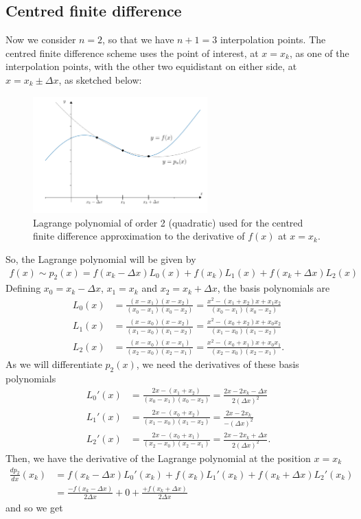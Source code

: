 \subsection{Centred finite difference}
Now we consider $n=2$, so that we have $n+1=3$ interpolation points. The centred finite difference scheme uses the point of interest, at $x=x_k$, as one of the interpolation points, with the other two equidistant on either side, at $x=x_k \pm \Delta x$, as sketched below:
\begin{figure}[H]
	\begin{center}
	\includegraphics[width=0.6\textwidth]{figures/ch5_centred_finite_difference.pdf} 
	  \caption{Lagrange polynomial of order 2 (quadratic) used for the centred finite difference approximation to the derivative of $f(x)$ at $x=x_k$.} \label{fig:ch5_centred_finite_difference}
	\end{center}
\end{figure}
So, the Lagrange polynomial will be given by
\begin{align*}
f(x) \sim p_2(x) = f(x_k - \Delta x)L_0(x) + f(x_k)L_1(x) + f(x_k + \Delta x)L_2(x)
\end{align*}
Defining $x_0=x_k - \Delta x$, $x_1=x_k$ and  $x_2=x_k + \Delta x$, the basis polynomials are
\begin{align*}
L_0(x) &= \frac{(x-x_1)(x-x_2)}{(x_0-x_1)(x_0-x_2)} = \frac{x^2 - (x_1+x_2)x + x_1x_2}{(x_0-x_1)(x_0-x_2)} \\
%
L_1(x) &= \frac{(x-x_0)(x-x_2)}{(x_1-x_0)(x_1-x_2)} = \frac{x^2 - (x_0+x_2)x + x_0x_2}{(x_1-x_0)(x_1-x_2)} \\
%
L_2(x) &= \frac{(x-x_0)(x-x_1)}{(x_2-x_0)(x_2-x_1)} = \frac{x^2 - (x_0+x_1)x + x_0x_1}{(x_2-x_0)(x_2-x_1)}.
\end{align*}
As we will differentiate $p_2(x)$, we need the derivatives of these basis polynomials
\begin{align*}
L_0'(x) &= \frac{2x - (x_1+x_2)}{(x_0-x_1)(x_0-x_2)} = \frac{2x - 2x_k - \Delta x}{2(\Delta x)^2} \\
%
L_1'(x) &= \frac{2x - (x_0+x_2)}{(x_1-x_0)(x_1-x_2)} = \frac{2x - 2x_k}{-(\Delta x)^2}\\
%
L_2'(x) &= \frac{2x - (x_0+x_1)}{(x_2-x_0)(x_2-x_1)} = \frac{2x - 2x_k + \Delta x}{2(\Delta x)^2}.
\end{align*}
Then, we have the derivative of the Lagrange polynomial at the position $x=x_k$
\begin{align*}
\frac{dp_2}{dx}(x_k) &= f(x_k - \Delta x) L_0'(x_k) + f(x_k)L_1'(x_k) + f(x_k + \Delta x)L_2'(x_k) \\
&= \frac{-f(x_k - \Delta x) }{2\Delta x} + 0 +  \frac{+f(x_k + \Delta x) }{2\Delta x} 
\end{align*}
and so we get

